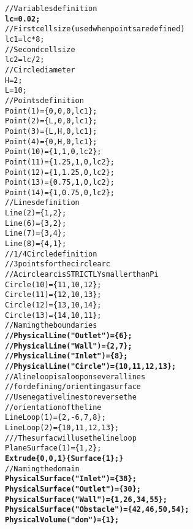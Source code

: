 \begin{alltt}
// Variables definition
{\bf{lc = 0.02;}}
// First cell size (used when points are defined)
lc1 = lc * 8;
// Second cell size
lc2 = lc / 2;
// Circle diameter
H=2;
L=10;
// Points definition 
Point(1)=\{0,0,0,lc1\};
Point(2) = \{L,0,0,lc1\};
Point(3) = \{L,H,0,lc1\};
Point(4) = \{0,H,0,lc1\};
Point(10)= \{1,1,0,lc2\};
Point(11)=\{1.25,1,0,lc2\}; 
Point(12)=\{1,1.25,0,lc2\}; 
Point(13)=\{0.75,1,0,lc2\}; 
Point(14)=\{1,0.75,0,lc2\};
// Lines definition
Line(2) = \{1,2\};
Line(6) = \{3,2\};
Line(7) = \{3,4\};
Line(8) = \{4,1\};
// 1/4 Circle definition
// 3 points for the circle arc
// A circle arc is STRICTLY smaller than Pi
Circle(10)=\{11,10,12\}; 
Circle(11)=\{12,10,13\}; 
Circle(12)=\{13,10,14\}; 
Circle(13)=\{14,10,11\};
// Naming the boundaries
{\bf{//Physical Line("Outlet") = \{6\};}}
{\bf{//Physical Line("Wall") = \{2,7\};}}
{\bf{//Physical Line("Inlet") = \{8\};}}
{\bf{//Physical Line("Circle") = \{10,11,12,13\};}}
// A lineloop is a loop on several lines
// for defining/orienting a surface
// Use negative lines to reverse the
// orientation of the line
Line Loop(1) = \{2,-6,7,8\};
Line Loop(2) = \{10,11,12,13\};
/// The surfac will use the lineloop
Plane Surface(1) = \{1,2\};
{\bf{Extrude \{0,0,1\} \{ Surface\{1\} ; \}}}
// Naming the domain
{\bf{Physical Surface("Inlet") = \{38\};}}
{\bf{Physical Surface("Outlet") = \{30\};}}
{\bf{Physical Surface("Wall") = \{1,26,34,55\};}}
{\bf{Physical Surface("Obstacle") = \{42,46,50,54\};}}
{\bf{Physical Volume("dom") = \{1\};}}
\end{alltt}
